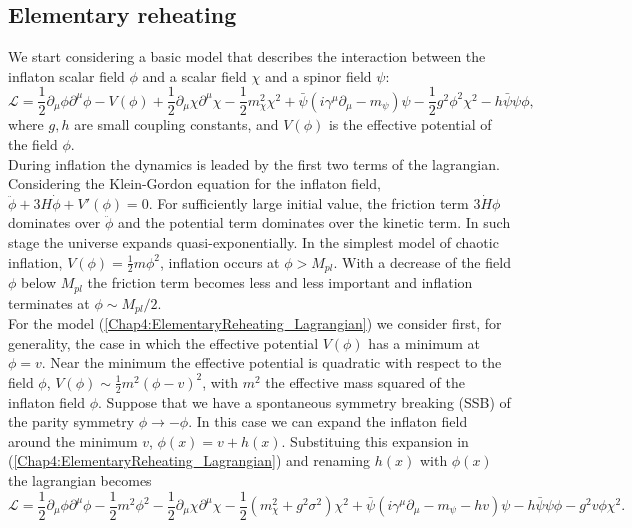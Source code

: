 \documentclass[11pt,a4paper,twoside]{book}
\begin{document}
\subsection{Elementary reheating}
We start considering a basic model that describes the interaction between the inflaton scalar field $\phi$ and a scalar field 	$\chi$ and a spinor field $\psi$:
\begin{equation}
	\label{Chap4:ElementaryReheating_Lagrangian}
	\mathcal{L}=\frac{1}{2}\partial_{\mu}\phi\partial^{\mu}{\phi} - V(\phi) +\frac{1}{2}\partial_{\mu}\chi\partial^{\mu}\chi -\frac{1}{2}m^{2}_{\chi}\chi^{2} + \bar{\psi}(i\gamma^{\mu}\partial_{\mu} - m_{\psi})\psi - \frac{1}{2}g^{2}\phi^{2}\chi^{2} - h\bar{\psi}\psi \phi,
\end{equation} 
where $ g,h $ are small coupling constants, and $ V(\phi) $ is the effective potential of the field $\phi$. \\
During inflation the dynamics is leaded by the first two terms of the lagrangian. Considering the Klein-Gordon equation  for the inflaton field, $ \ddot{\phi} + 3H\dot{\phi} + V'(\phi) = 0 $. For sufficiently large initial value, the friction term $ 3\dot{H}\phi $ dominates over $\ddot{\phi}$ and the potential term dominates over the kinetic term. In such stage the universe expands quasi-exponentially. In the simplest model of chaotic inflation, $ V(\phi)=\frac{1}{2}m\phi^{2} $, inflation occurs at $\phi > M_{pl}$. With a decrease of the field $ \phi $ below $ M_{pl} $ the friction term becomes less and less important and inflation terminates at $ \phi \sim M_{pl}/2 $.\\
For the model (\ref{Chap4:ElementaryReheating_Lagrangian}) we consider first, for generality, the case in which the effective potential $ V(\phi) $ has a minimum at $ \phi = v $. Near the minimum the effective potential  is quadratic with respect to the field $\phi$, $ V(\phi) \sim \frac{1}{2}m^{2}(\phi-v)^{2} $, with $ m^{2} $ the effective mass squared of the inflaton field $\phi$. Suppose that we have a spontaneous symmetry breaking (SSB) of the parity symmetry $ \phi  \rightarrow -\phi$. In this case we can expand the inflaton field around the minimum $ v $, $ \phi(x)=v + h(x)  $. Substituing this expansion in (\ref{Chap4:ElementaryReheating_Lagrangian}) and renaming $ h(x) $ with $\phi(x)$ the lagrangian becomes
\begin{equation}
	\label{Chap4:ElementaryReheating_LafterSSB}
	\mathcal{L}=\frac{1}{2}\partial_{\mu}\phi\partial^{\mu}\phi -\frac{1}{2}m^{2}\phi^{2} - \frac{1}{2}\partial_{\mu}\chi\partial^{\mu}\chi -\frac{1}{2}(m^{2}_{\chi} +g^{2}\sigma^{2})\chi^{2} + \bar{\psi}(i\gamma^{\mu}\partial_{\mu} - m_{\psi} - hv )\psi  - h\bar{\psi}\psi\phi -g^{2}v\phi\chi^{2}.
\end{equation}
\end{document}
